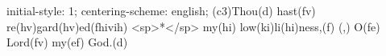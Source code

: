 initial-style: 1;
centering-scheme: english;
(c3)Thou(d) hast(fv) re(hv)gard(hv)ed(fhivih) <sp>*</sp> my(hi) low(ki)li(hi)ness,(f) (,) O(fe) Lord(fv) my(ef) God.(d)
